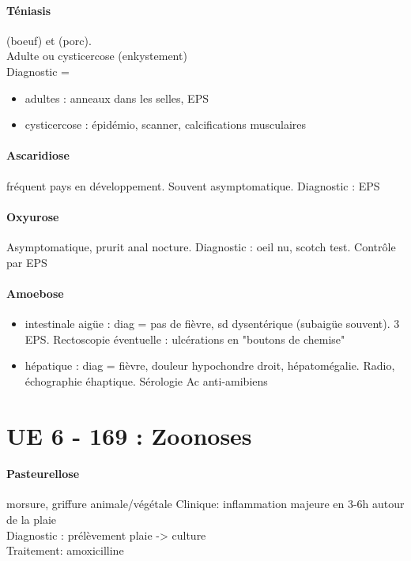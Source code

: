 \documentclass{article}
\begin{document}
\paragraph{Téniasis}  (boeuf) et  (porc).\\
  Adulte ou cysticercose (enkystement)\\
  Diagnostic = 
  \begin{itemize}
    \item adultes : anneaux dans les selles, EPS
    \item cysticercose : épidémio, scanner, calcifications musculaires
  \end{itemize}

\paragraph{Ascaridiose} fréquent pays en développement. Souvent asymptomatique.
Diagnostic : EPS

\paragraph{Oxyurose} Asymptomatique, prurit anal nocture. Diagnostic : oeil nu,
scotch test. Contrôle par EPS

\paragraph{Amoebose} 
\begin{itemize}
  \item intestinale aigüe : diag = pas de fièvre, sd dysentérique (subaigüe
    souvent). 3 EPS. Rectoscopie éventuelle : ulcérations en "boutons de chemise"
  \item hépatique : diag = fièvre, douleur hypochondre droit, hépatomégalie.
    Radio, échographie éhaptique. Sérologie Ac anti-amibiens
\end{itemize}

\section{UE 6 - 169 : Zoonoses}%
\label{sec:ue_6_169_zoonoses}

\paragraph{Pasteurellose} morsure, griffure animale/végétale
Clinique: inflammation majeure en 3-6h autour de la plaie\\
Diagnostic : prélèvement plaie -> culture\\
Traitement: amoxicilline
\end{document}
